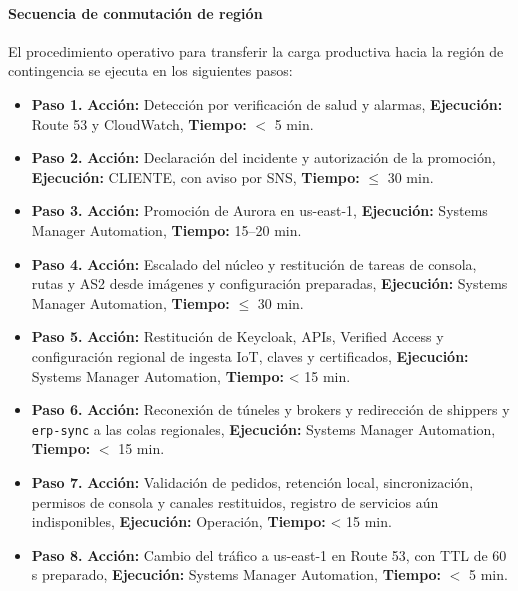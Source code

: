 \paragraph*{Secuencia de conmutación de región}
\label{tab:4-3-6}
El procedimiento operativo para transferir la carga productiva hacia la región de contingencia se ejecuta en los siguientes pasos:
\begin{itemize}
\item \textbf{Paso 1.} \textbf{Acción:} Detección por verificación de salud y alarmas, \textbf{Ejecución:} Route 53 y CloudWatch, \textbf{Tiempo:} $<$ 5 min.
\item \textbf{Paso 2.} \textbf{Acción:} Declaración del incidente y autorización de la promoción, \textbf{Ejecución:} CLIENTE, con aviso por SNS, \textbf{Tiempo:} $\leq$ 30 min.
\item \textbf{Paso 3.} \textbf{Acción:} Promoción de Aurora en us-east-1, \textbf{Ejecución:} Systems Manager Automation, \textbf{Tiempo:} 15--20 min.
\item \textbf{Paso 4.} \textbf{Acción:} Escalado del núcleo y restitución de tareas de consola, rutas y AS2 desde imágenes y configuración preparadas, \textbf{Ejecución:} Systems Manager Automation, \textbf{Tiempo:} $\leq$ 30 min.
\item \textbf{Paso 5.} \textbf{Acción:} Restitución de Keycloak, APIs, Verified Access y configuración regional de ingesta IoT, claves y certificados, \textbf{Ejecución:} Systems Manager Automation, \textbf{Tiempo:} < 15 min.
\item \textbf{Paso 6.} \textbf{Acción:} Reconexión de túneles y brokers y redirección de shippers y \texttt{erp-sync} a las colas regionales, \textbf{Ejecución:} Systems Manager Automation, \textbf{Tiempo:} $<$ 15 min.
\item \textbf{Paso 7.} \textbf{Acción:} Validación de pedidos, retención local, sincronización, permisos de consola y canales restituidos, registro de servicios aún indisponibles, \textbf{Ejecución:} Operación, \textbf{Tiempo:} < 15 min.
\item \textbf{Paso 8.} \textbf{Acción:} Cambio del tráfico a us-east-1 en Route 53, con TTL de 60 s preparado, \textbf{Ejecución:} Systems Manager Automation, \textbf{Tiempo:} $<$ 5 min.
\end{itemize}


